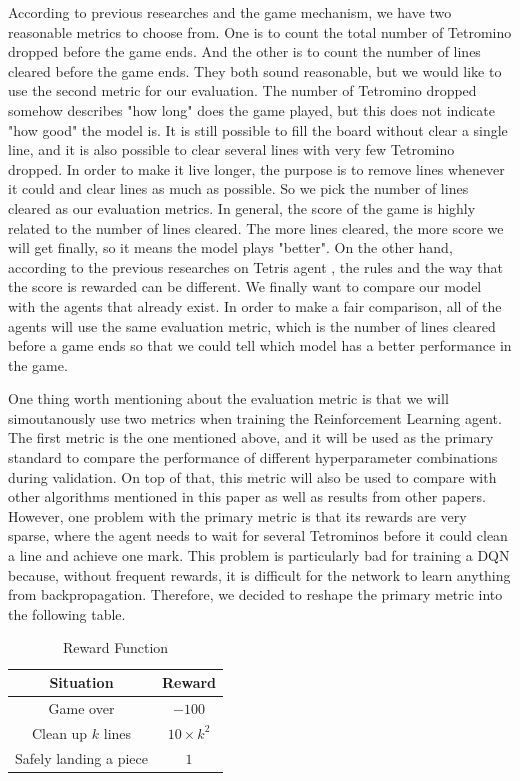 \documentclass[letterpaper]{article} %
\begin{document}
According to previous researches and the game mechanism, we have two reasonable metrics to choose from. One is to count the total number of Tetromino dropped before the game ends. And the other is to count the number of lines cleared before the game ends. They both sound reasonable, but we would like to use the second metric for our evaluation. The number of Tetromino dropped somehow describes "how long" does the game played, but this does not indicate "how good" the model is. It is still possible to fill the board without clear a single line, and it is also possible to clear several lines with very few Tetromino dropped. In order to make it live longer, the purpose is to remove lines whenever it could and clear lines as much as possible. So we pick the number of lines cleared as our evaluation metrics. In general, the score of the game is highly related to the number of lines cleared. The more lines cleared, the more score we will get finally, so it means the model plays "better". On the other hand, according to the previous researches on Tetris agent \cite{SO19}, the rules and the way that the score is rewarded can be different. We finally want to compare our model with the agents that already exist. In order to make a fair comparison, all of the agents will use the same evaluation metric, which is the number of lines cleared before a game ends so that we could tell which model has a better performance in the game.

One thing worth mentioning about the evaluation metric is that we will simoutanously use two metrics when training the Reinforcement Learning agent. The first metric is the one mentioned above, and it will be used as the primary standard to compare the performance of different hyperparameter combinations during validation. On top of that, this metric will also be used to compare with other algorithms mentioned in this paper as well as results from other papers. However, one problem with the primary metric is that its rewards are very sparse, where the agent needs to wait for several Tetrominos before it could clean a line and achieve one mark. This problem is particularly bad for training a DQN because, without frequent rewards, it is difficult for the network to learn anything from backpropagation. Therefore, we decided to reshape the primary metric into the following table.

\begin{table}[h!]
  \centering
  \normalsize{
    \begin{tabular}{ |c|c| } 
      \hline
      Situation & Reward  \\ 
      \hline
       Game over & $-100$  \\ 
       \hline
       Clean up $k$ lines & $10\times k^{2}$  \\ 
       \hline
       Safely landing a piece & $1$  \\
       \hline
      \end{tabular}}
  \caption{Reward Function}
  \label{tab:rewardsCopy}
\end{table} 
\end{document}
